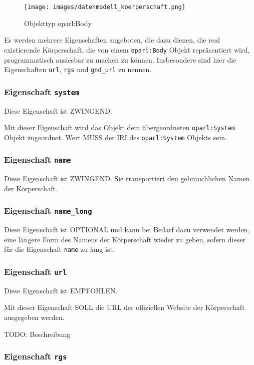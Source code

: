 \documentclass[,a4paper]{article}
\makeatletter
\def\maxwidth{\ifdim\Gin@nat@width>\linewidth\linewidth
\else\Gin@nat@width\fi}
\let\Oldincludegraphics\includegraphics
\renewcommand{\includegraphics}[1]{\Oldincludegraphics[width=\maxwidth]{#1}}
\makeatother
\begin{document}
\begin{figure}[htbp]
\centering
\texttt{[image: images/datenmodell\_koerperschaft.png]}
\caption{Objekttyp oparl:Body}
\end{figure}

Es werden mehrere Eigenschaften angeboten, die dazu dienen, die real
existierende Körperschaft, die von einem \texttt{oparl:Body} Objekt
repräsentiert wird, programmatisch auslesbar zu machen zu können.
Insbesondere sind hier die Eigenschaften \texttt{url}, \texttt{rgs} und
\texttt{gnd\_url} zu nennen.

\subsubsection{Eigenschaft \texttt{system}}

Diese Eigenschaft ist ZWINGEND.

Mit dieser Eigenschaft wird das Objekt dem übergeordneten
\texttt{oparl:System} Objekt zugeordnet. Wert MUSS der IRI des
\texttt{oparl:System} Objekts sein.

\subsubsection{Eigenschaft \texttt{name}}

Diese Eigenschaft ist ZWINGEND. Sie transportiert den gebräuchlichen
Namen der Körperschaft.

\subsubsection{Eigenschaft \texttt{name\_long}}

Diese Eigenschaft ist OPTIONAL und kann bei Bedarf dazu verwendet
werden, eine längere Form des Namens der Körperschaft wieder zu geben,
sofern dieser für die Eigenschaft \texttt{name} zu lang ist.

\subsubsection{Eigenschaft \texttt{url}}

Diese Eigenschaft ist EMPFOHLEN.

Mit dieser Eigenschaft SOLL die URL der offiziellen Website der
Körperschaft ausgegeben werden.

TODO: Beschreibung

\subsubsection{Eigenschaft \texttt{rgs}}
\end{document}

